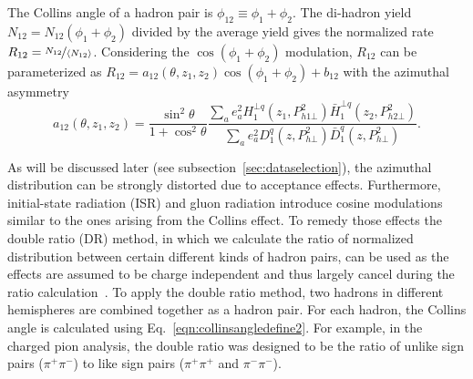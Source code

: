 The Collins angle of a hadron pair is $\phi_{12} \equiv \phi_1+\phi_2$. The di-hadron yield $N_{12}=N_{12}(\phi_1+\phi_2)$ divided by the average yield gives the normalized rate $R_{12}=\nicefrac{N_{12}}{\langle  N_{12}\rangle}$. Considering the $\cos(\phi_1+\phi_2)$ modulation, $R_{12}$ can be parameterized as $R_{12}=a_{12}(\theta,z_1,z_2)\cos(\phi_1+\phi_2)+b_{12}$ with the azimuthal asymmetry
\begin{equation}
a_{12}(\theta,z_1,z_2)=\frac{\sin^2\theta}{1+\cos^2\theta}\frac{\sum\limits_{a}e^2_aH^{\bot q}_1(z_1,P^2_{h1\bot})\bar{H}^{\bot q}_1(z_2,P^2_{h2\bot})}{\sum\limits_{a}e^2_aD^q_1(z,P^2_{h\bot})\bar{D}^q_1(z,P^2_{h\bot})}.
\end{equation}

As will be discussed later (see subsection~\ref{sec:dataselection}), the azimuthal distribution can be strongly distorted due to acceptance effects. Furthermore, initial-state radiation (ISR) and gluon radiation introduce cosine modulations similar to the ones arising from the Collins effect. To remedy those effects the double ratio (DR) method, in which we calculate the ratio of normalized distribution between certain different kinds of hadron pairs, can be used as the effects are assumed to be charge independent and thus largely cancel during the ratio calculation~\cite{ChargedPionResult,CollinsInSIDISandEE}. To apply the double ratio method, two hadrons in different hemispheres are combined together as a hadron pair. For each hadron, the Collins angle is calculated using Eq.~\eqref{eqn:collinsangledefine2}. For example, in the charged pion analysis, the double ratio was designed to be the ratio of unlike sign pairs ($\pi^+\pi^-$) to like sign pairs ($\pi^+\pi^+$ and $\pi^-\pi^-$).

